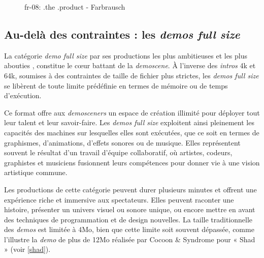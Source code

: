 \begin{figure}[h]
\begin{minipage}[b]{0.30\linewidth}
  \end{minipage}
  \caption{fr-08: .the .product - Farbrausch}
  \label{farb}
\end{figure}


\subsection*{Au-delà des contraintes : les \textit{demos full size}}


La catégorie \textit{demo full size} par ses productions les plus ambitieuses et les plus abouties , constitue le cœur battant de la \textit{demoscene}. À l'inverse des \textit{intros} 4k et 64k, soumises à des contraintes de taille de fichier plus strictes, les \textit{demos full size} se libèrent de toute limite prédéfinie en termes de mémoire ou de temps d'exécution.

Ce format offre aux \textit{demosceners} un espace de création illimité pour déployer tout leur talent et leur savoir-faire. Les \textit{demos full size} exploitent ainsi pleinement les capacités des machines sur lesquelles elles sont exécutées, que ce soit en termes de graphismes, d'animations, d'effets sonores ou de musique. Elles représentent souvent le résultat d'un travail d'équipe collaboratif, où artistes, codeurs, graphistes et musiciens fusionnent leurs compétences pour donner vie à une vision artistique commune.

Les productions de cette catégorie peuvent durer plusieurs minutes et offrent une expérience riche et immersive aux spectateurs. Elles peuvent raconter une histoire, présenter un univers visuel ou sonore unique, ou encore mettre en avant des techniques de programmation et de design nouvelles. La taille traditionnelle des \textit{demos} est limitée à 4Mo, bien que cette limite soit souvent dépassée, comme l'illustre la \textit{demo} de plus de 12Mo réalisée par Cocoon \& Syndrome pour « Shad » (voir \ref{shad}).

